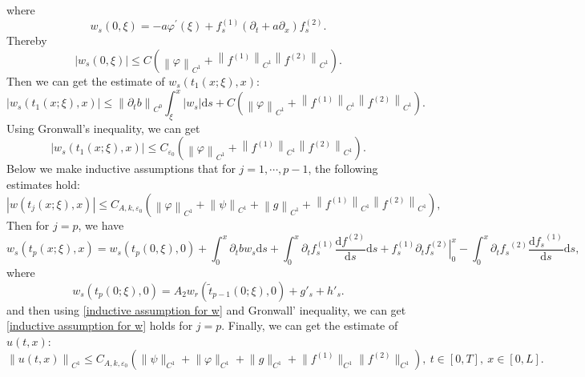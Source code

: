 \documentclass[a4paper,reqno,11pt]{amsart}
\numberwithin{equation}{section} %
\begin{document}
where
\begin{equation}\label{w_s at 0}
w_s(0, \xi)=-a \varphi^{\prime}(\xi)+f_s^{(1)}\left(\partial_t+a \partial_x\right) f_s^{(2)} .
\end{equation}
Thereby
$$
\left| w_s(0,\xi ) \right|\leq C\left( \left\| \varphi \right\| _{C^1}+\left\| f^{\left( 1 \right)} \right\| _{C^1}\left\| f^{(2)} \right\| _{C^1} \right) .
$$
Then we can get the estimate of $w_s\left( t_1(x;\xi ),x \right) $:
$$
\left| w_s\left( t_1(x;\xi ),x \right) \right|\leq \left\| \partial _tb \right\| _{C^0}\int_{\xi}^x{\left| w_s \right|\mathrm{d}s}+C\left( \left\| \varphi \right\| _{C^1}+\left\| f^{(1)} \right\| _{C^1}\left\| f^{(2)} \right\| _{C^1} \right) .
$$
Using Gronwall's inequality, we can get
$$
\left| w_s\left( t_1(x;\xi ),x \right) \right|\leq C_{\varepsilon _0}\left( \left\| \varphi \right\| _{C^1}+\left\| f^{(1)} \right\| _{C^1}\left\| f^{(2)} \right\| _{C^1} \right) .
$$
Below we make inductive assumptions that for $j=1,\cdots,p-1$, the following estimates hold:
\begin{equation}\label{inductive assumption for w}
\left| w\left( t_j(x;\xi ),x \right) \right|\leq C_{A,k,\varepsilon _0}\left( \left\| \varphi \right\| _{C^1}+\left\| \psi \right\| _{C^1}+\left\| g \right\| _{C^1}+\left\| f^{(1)} \right\| _{C^1}\left\| f^{(2)} \right\| _{C^1} \right) ,
\end{equation}
Then for $j=p$, we have
\begin{equation}\label{e of w_s p}
	w_s\left( t_p(x;\xi ),x \right) =w_s(t_p(0,\xi ),0)+\int_{0}^x{\partial _tbw_s\mathrm{d}s}+\int_{0}^x{\partial _tf_{s}^{(1)}\frac{\mathrm{d}f^{(2)}}{\mathrm{d}s}\mathrm{d}s}+\left. f_{s}^{(1)}\partial _tf_{s}^{(2)} \right|_{0}^{x}-\int_{0}^x{\partial _t{f_s}^{(2)}\frac{\mathrm{d}{f_s}^{(1)}}{\mathrm{d}s}\mathrm{d}s},
\end{equation}
where
\begin{equation}\label{w_s at t_p(t,0)}
	w_s(t_p(0 ; \xi), 0)= A_2 w_r\left(\tilde{t}_{p-1}(0 ; \xi), 0\right)+g'_s+h'_s .
\end{equation}
and then using \eqref{inductive assumption for w} and Gronwall' inequality, we can get \eqref{inductive assumption for w} holds for $j=p$.
Finally, we can get the estimate of $u(t,x)$:
\begin{equation}\label{estimate of u}
	\left\| u(t,x) \right\|_{C^1} \leq C_{A,k,\varepsilon _0}(\lVert \psi \rVert _{C^1}+\lVert \varphi  \rVert _{C^1}+  \lVert g \rVert _{C^1}+\lVert f^{(1)} \rVert _{C^1}\lVert f^{(2)} \rVert _{C^1}) ,\ t\in [0,T],\ x\in [0,L].
\end{equation}
\end{document}

